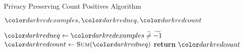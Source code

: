 \begin{algorithm}[H]
\caption{Privacy Preserving Count Positives Algorithm}\label{a:id3-count-positives-pp}
\begin{algorithmic}[1]
\Require $\red{examples}, \red{neq}, \red{count}$

  \State $\red{neq} \gets \red{examples} \hneq \enc{-1}$
  \State $\red{count} \gets \textsc{Sum}(\red{neq})$
  \State \textbf{return} $\red{count}$
\EndProcedure
\end{algorithmic}
\end{algorithm}
